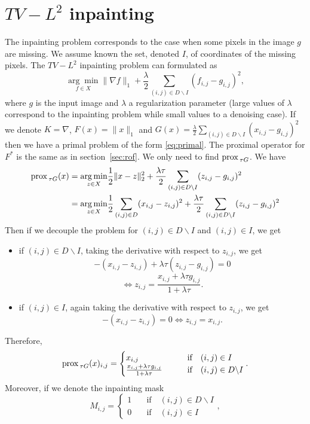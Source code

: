 \documentclass[letter,10pt]{article}
\def\prox{\textup{prox\,}}
\begin{document}
\section{$TV-L^2$ inpainting}
The inpainting problem corresponds to the case when some pixels in the image $g$ are missing. We assume known the set, denoted $I$, of coordinates of the missing pixels. The 
$TV-L^2$ inpainting problem can formulated as
$$\underset{f\in X}{\arg\min}\|\nabla f\|_1+\frac{\lambda}{2}\sum_{(i,j)\in D\backslash I}(f_{i,j}-g_{i,j})^2,$$
where $g$ is the input image and $\lambda$ a regularization parameter (large values of $\lambda$ correspond to the inpainting problem while small values to a denoising case). If 
we denote $K=\nabla$, $F(x)=\|x\|_1$ and $G(x)=\frac{\lambda}{2}\sum_{(i,j)\in D\backslash 
I}(x_{i,j}-g_{i,j})^2$ then we have a primal problem of the form \eqref{eq:primal}. The proximal operator for $F^*$ is the same as in section~\ref{sec:rof}. We only need 
to find $\prox_{\tau G}$. We have
\begin{align*}
\prox_{\tau G}(x)&=\underset{z\in X}{\arg\min}\frac{1}{2}\|x-z\|_2^2+\frac{\lambda\tau}{2}\sum_{(i,j)\in D\backslash I}(z_{i,j}-g_{i,j})^2\\
&=\underset{z\in 
X}{\arg\min}\frac{1}{2}\sum_{(i,j)\in D}(x_{i,j}-z_{i,j})^2+\frac{\lambda\tau}{2}\sum_{(i,j)\in D\backslash I}(z_{i,j}-g_{i,j})^2
\end{align*}
Then if we decouple the problem for $(i,j)\in D\backslash I$ and $(i,j)\in I$, we get
\begin{itemize}
 \item if $(i,j)\in D\backslash I$, taking the derivative with respect to $z_{i,j}$, we get
 $$-(x_{i,j}-z_{i,j})+\lambda\tau(z_{i,j}-g_{i,j})=0$$
 $$\Leftrightarrow z_{i,j}=\frac{x_{i,j}+\lambda\tau g_{i,j}}{1+\lambda\tau}.$$
 \item if $(i,j)\in I$, again taking the derivative with respect to $z_{i,j}$, we get
 $$-(x_{i,j}-z_{i,j})=0 \Leftrightarrow z_{i,j}=x_{i,j}.$$
\end{itemize}
Therefore,
$$\prox_{\tau G}(x)_{i,j}=\begin{cases} x_{i,j} &\text{if}\quad (i,j)\in I\\ \frac{x_{i,j}+\lambda\tau g_{i,j}}{1+\lambda\tau}\qquad&\text{if}\quad (i,j)\in D\backslash 
I\end{cases}.$$
Moreover, if we denote the inpainting mask $$M_{i,j}=\begin{cases} 1\quad &\text{if}\quad (i,j)\in D\backslash I\\ 0 &\text{if}\quad (i,j)\in I\end{cases},$$
\end{document}
